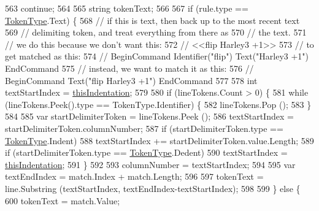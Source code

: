 \begin{DoxyCode}
563                         \textcolor{keywordflow}{continue};
564 
565                     \textcolor{keywordtype}{string} tokenText;
566 
567                     \textcolor{keywordflow}{if} (rule.type == \hyperlink{a00041_a301aa7c866593a5b625a8fc158bbeace}{TokenType}.Text) \{
568                         \textcolor{comment}{// if this is text, then back up to the most recent text}
569                         \textcolor{comment}{// delimiting token, and treat everything from there as}
570                         \textcolor{comment}{// the text.}
571                         \textcolor{comment}{// we do this because we don't want this:}
572                         \textcolor{comment}{//    <<flip Harley3 +1>>}
573                         \textcolor{comment}{// to get matched as this:}
574                         \textcolor{comment}{//    BeginCommand Identifier("flip") Text("Harley3 +1") EndCommand}
575                         \textcolor{comment}{// instead, we want to match it as this:}
576                         \textcolor{comment}{//    BeginCommand Text("flip Harley3 +1") EndCommand}
577 
578                         \textcolor{keywordtype}{int} textStartIndex = \hyperlink{a00330_a0e59365a4aa5811f6495b92a51e23573}{thisIndentation};
579 
580                         \textcolor{keywordflow}{if} (lineTokens.Count > 0) \{
581                             \textcolor{keywordflow}{while} (lineTokens.Peek().type == TokenType.Identifier) \{
582                                 lineTokens.Pop ();
583                             \}
584 
585                             var startDelimiterToken = lineTokens.Peek ();
586                             textStartIndex = startDelimiterToken.columnNumber;
587                             \textcolor{keywordflow}{if} (startDelimiterToken.type == \hyperlink{a00041_a301aa7c866593a5b625a8fc158bbeace}{TokenType}.Indent)
588                                 textStartIndex += startDelimiterToken.value.Length;
589                             \textcolor{keywordflow}{if} (startDelimiterToken.type == \hyperlink{a00041_a301aa7c866593a5b625a8fc158bbeace}{TokenType}.Dedent)
590                                 textStartIndex = \hyperlink{a00330_a0e59365a4aa5811f6495b92a51e23573}{thisIndentation};
591                         \}
592 
593                         columnNumber = textStartIndex;
594 
595                         var textEndIndex = match.Index + match.Length;
596 
597                         tokenText = line.Substring (textStartIndex, textEndIndex-textStartIndex);
598 
599                     \} \textcolor{keywordflow}{else} \{
600                         tokenText = match.Value;

\end{DoxyCode}
